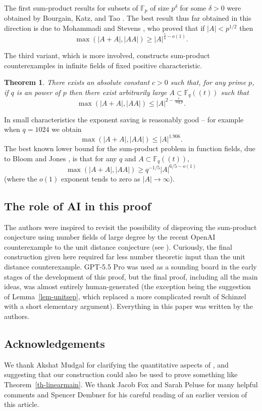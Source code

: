 \documentclass{amsart}
\numberwithin{equation}{section}
\newcommand{\abs}[1]{\mathopen{}\left| #1\mathclose{}\right|}
\newcommand{\bbf}{\mathbb{F}}
\newtheorem{theorem}{Theorem}[section]
\begin{document}
The first sum-product results for subsets of $\bbf_p$ of size $p^\delta$ for some $\delta>0$ were obtained by Bourgain, Katz, and Tao \cite{BKT04}. The best result thus far obtained in this direction is due to Mohammadi and Stevens \cite{MoSt23}, who proved that if $\abs{A}< p^{1/2}$ then 
\[\max(\abs{A+A},\abs{AA})\geq \abs{A}^{\frac{5}{4}-o(1)}.\]

The third variant, which is more involved, constructs sum-product counterexamples in infinite fields of fixed positive characteristic.

\begin{theorem}\label{th-ffmain}
There exists an absolute constant $c>0$ such that, for any prime $p$, if $q$ is an power of $p$ then there exist arbitrarily large $A\subset \bbf_{q}((t))$ such that
\[\max(\abs{A+A},\abs{AA})\leq \abs{A}^{2-\frac{c}{\log p}}.\]
\end{theorem}
In small characteristics the exponent saving is reasonably good -- for example when $q=1024$ we obtain 
\[\max(\abs{A+A},\abs{AA})\leq \abs{A}^{1.906}.\]
The best known lower bound for the sum-product problem in function fields, due to Bloom and Jones \cite{BlJo14}, is that for any $q$ and $A\subset \bbf_q((t))$, 
\[\max(\abs{A+A}, \abs{AA})\geq  q^{-1/5}\abs{A}^{6/5-o(1)}\]
(where the $o(1)$ exponent tends to zero as $\abs{A}\to \infty$).
\subsection*{The role of AI in this proof} 
The authors were inspired to revisit
the possibility of disproving the sum-product conjecture using number
fields of large degree by the recent OpenAI counterexample to the unit distance conjecture (see \cite{ABGLSSTWW2026UnitDistance}). Curiously, the final construction given here required far less number theoretic input than the unit distance counterexample. GPT-5.5 Pro was used as a sounding board in the early stages of the development of this proof, but the final proof, including all the main ideas, was almost entirely human-generated (the exception being the suggestion of Lemma~\ref{lem-unitsep}, which replaced a more complicated result of Schinzel with a short elementary argument). Everything in this paper was written by the authors.

\subsection*{Acknowledgements}

We thank Akshat Mudgal for clarifying the quantitative aspects of \cite{Mu24}, and suggesting that our construction could also be used to prove something like Theorem~\ref{th-linearmain}. We thank Jacob Fox and Sarah Peluse for many helpful comments and Spencer Dembner for his careful reading of an earlier version of this article. 
\end{document}
